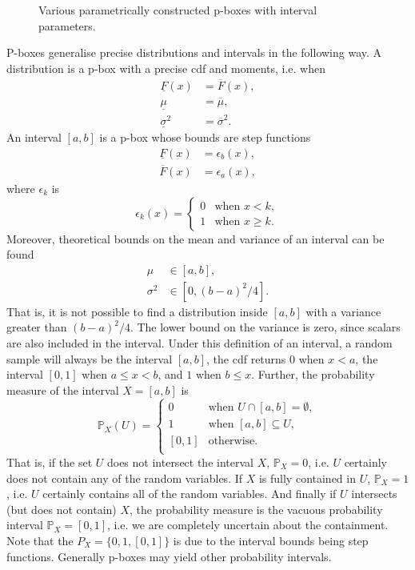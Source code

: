 \documentclass{juliacon}
\begin{document}
\begin{figure}[htp]
  \caption{Various parametrically constructed p-boxes with interval parameters.}
  \label{fig:figure3}
\end{figure}
P-boxes generalise precise distributions and intervals in the following way. A distribution is a p-box with a precise cdf and moments, i.e. when
\begin{align*}
  \underline{F}(x) &= \overline{F}(x), \\ 
  \underline{\mu}  &= \overline{\mu}, \\ 
  \underline{\sigma}^2 &= \overline{\sigma}^2 .
\end{align*}
\noindent An interval $[a,b]$ is a p-box whose bounds are step functions
\begin{align*}
    \underline{F}(x) &= \epsilon_{b}(x) ,\\
    \overline{F}(x) &= \epsilon_{a}(x) ,
\end{align*}
\noindent where $\epsilon_k$ is
\begin{equation*}
   \epsilon_k(x) = \begin{cases} 0 &\text{when } x < k, \\ 1 &\text{when } x \geq k. \end{cases} 
\end{equation*}
\noindent Moreover, theoretical bounds on the mean and variance of an interval can be found~\cite{ferson2002ramas}
\begin{align*}
  \mu &\in [a, b], \\
  \sigma^2 &\in [0, (b - a)^{2}/4].
\end{align*}
\noindent That is, it is not possible to find a distribution inside $[a, b]$ with a variance greater than $(b-a)^{2}/4$. The lower bound on the variance is zero, since scalars are also included in the interval. Under this definition of an interval, a random sample will always be the interval $[a, b]$, the cdf returns 0 when $x < a$, the interval $[0,1]$ when $a \leq x < b$, and $1$ when $b \leq x$. Further, the probability measure of the interval $X = [a, b]$ is
\begin{equation*}
  \mathbb{P}_{X}(U) = \begin{cases}
    0 & \text{when } U \cap [a,b] = \emptyset, \\
    1 & \text{when } [a,b] \subseteq U,  \\
    [0, 1] & \text{otherwise.}\\
  \end{cases}
\end{equation*}
\noindent That is, if the set $U$ does not intersect the interval $X$, $\mathbb{P}_{X}=0$, i.e. $U$ certainly does not contain any of the random variables. If $X$ is fully contained in $U$, $\mathbb{P}_{X}=1$, i.e. $U$ certainly contains all of the random variables. And finally if $U$ intersects (but does not contain) $X$, the probability measure is the vacuous probability interval $\mathbb{P}_{X} = [0, 1]$, i.e. we are completely uncertain about the containment. Note that the $P_{X} = \{0, 1, [0,1]\}$ is due to the interval bounds being step functions. Generally p-boxes may yield other probability intervals.
\end{document}
